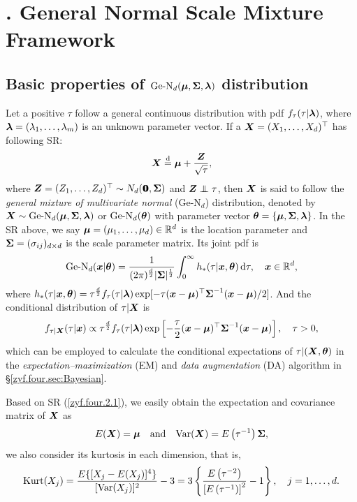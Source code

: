 \section{$\!\!\!\!\!\!\!$. General Normal Scale Mixture Framework}\label{zyf.four.sec:GeN}    %

\subsection{Basic properties of $\mbox{Ge-N}_d({\boldsymbol{\mu}}, {\mbox{\boldmath$\Sigma$}}, {\boldsymbol{\lambda}})$ distribution}\label{zyf.four.sec:GeN.definition}        %

Let a positive \trv $\tau$ follow a general continuous distribution with pdf $f_\tau(\tau | {\boldsymbol{\lambda}})$, where ${\boldsymbol{\lambda}} = (\lambda_1, \dots, \lambda_m)$ is an unknown parameter vector. If a \trv ${\boldsymbol{X}} = (X_1, \dots, X_d)^\top$ has following SR:
\begin{eqnarray}    \label{zyf.four.2.1}
    {\boldsymbol{X}} \stackrel{{\rm d}}{=} {\boldsymbol{\mu}} + \frac{{\boldsymbol{Z}}}{\sqrt{\tau}}, 
\end{eqnarray}
where ${\boldsymbol{Z}} = (Z_1, \dots, Z_d)^\top \sim N_d({\bf 0}\!\!\!{\bf 0}, {\mbox{\boldmath$\Sigma$}})$ and $\ibZ \inde \tau$, then ${\boldsymbol{X}}$ is said to follow the \textit{general mixture of multivariate normal} (Ge-N$_d$) distribution, denoted by ${\boldsymbol{X}} \sim \mbox{Ge-N}_d({\boldsymbol{\mu}}, {\mbox{\boldmath$\Sigma$}}, {\boldsymbol{\lambda}})$ or $\mbox{Ge-N}_d({\boldsymbol{\theta}})$ with parameter vector ${\boldsymbol{\theta}} = \{{\boldsymbol{\mu}}, {\mbox{\boldmath$\Sigma$}}, {\boldsymbol{\lambda}}\}$. In the SR above, we say ${\boldsymbol{\mu}} = (\mu_1, \dots, \mu_d) \in {\mathbb{R}}^d$ is the location parameter and ${\mbox{\boldmath$\Sigma$}} = (\sigma_{ij})_{d \times d}$ is the scale parameter matrix. Its joint pdf is
\begin{eqnarray}    \label{zyf.four.2.2}
    \mbox{Ge-N}_d({\boldsymbol{x}} | {\boldsymbol{\theta}}) = \frac{1}{(2\pi)^\frac{d}{2} |{\mbox{\boldmath$\Sigma$}}|^\frac{1}{2}} \int_0^\infty h_*(\tau | {\boldsymbol{x}}, {\boldsymbol{\theta}}) \,\mbox{d} \tau, \quad {\boldsymbol{x}} \in {\mathbb{R}}^d,
\end{eqnarray}
where $h_*(\tau | {\boldsymbol{x}}, {\boldsymbol{\theta}}) = \tau^\frac{d}{2} f_\tau(\tau | {\boldsymbol{\lambda}}) \exp[-\tau({\boldsymbol{x}} - {\boldsymbol{\mu}})^\top {\mbox{\boldmath$\Sigma$}}^{-1} ({\boldsymbol{x}} - {\boldsymbol{\mu}}) / 2]$. And the conditional distribution of $\tau | {\boldsymbol{X}}$ is
\begin{eqnarray}    \label{zyf.four.2.3}
    f_{\tau | {\boldsymbol{X}}} (\tau | {\boldsymbol{x}}) \propto \tau^\frac{d}{2} f_\tau(\tau | {\boldsymbol{\lambda}}) \exp\left[ -\frac{\tau}{2} ({\boldsymbol{x}} - {\boldsymbol{\mu}})^\top {\mbox{\boldmath$\Sigma$}}^{-1} ({\boldsymbol{x}} - {\boldsymbol{\mu}}) \right], \quad \tau > 0,
\end{eqnarray}
which can be employed to calculate the conditional expectations of $\tau | ({\boldsymbol{X}}, {\boldsymbol{\theta}})$ in the \textit{expectation--maximization} (EM) and \textit{data augmentation} (DA) algorithm in \S\ref{zyf.four.sec:Bayesian}.

Based on SR (\ref{zyf.four.2.1}), we easily obtain the expectation and covariance matrix of ${\boldsymbol{X}}$ as
\begin{eqnarray}    \label{zyf.four.2.4}
    E({\boldsymbol{X}}) = {\boldsymbol{\mu}} \quad \mbox{and} \quad \mbox{Var}({\boldsymbol{X}}) = E\left( \tau^{-1} \right) {\mbox{\boldmath$\Sigma$}},
\end{eqnarray}
we also consider its kurtosis in each dimension, that is, 
\begin{eqnarray*}
    \mbox{Kurt}(X_j) = \frac{E\{[X_j - E(X_j)]^4\}}{[\mbox{Var}(X_j)]^2} - 3 = 3\left\{ \frac{E\left( \tau^{-2} \right)}{\left[ E\left( \tau^{-1} \right)\right]^2} - 1\right\}, \quad j = 1, \dots, d.
\end{eqnarray*}

